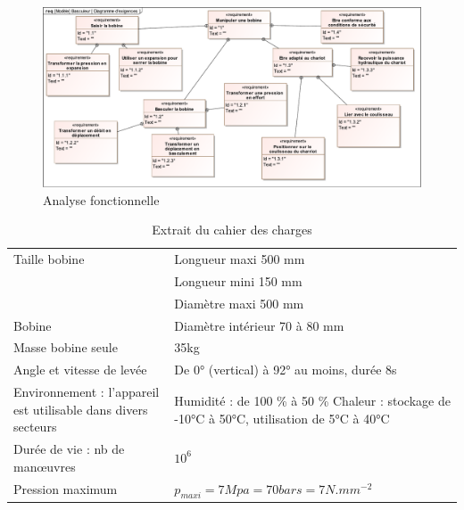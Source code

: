 \begin{figure}[ht!]
\begin{center}
 \includegraphics[width=0.8\linewidth]{img/fig04c}
\end{center}
\caption{Analyse fonctionnelle}
\label{fig04c}
\end{figure}

\begin{table}[ht!]
\begin{center}
\begin{tabular}{|m{6cm}|m{10cm}|}
\hline
Taille bobine & Longueur maxi 500 mm \\
& Longueur mini 150 mm \\
& Diamètre maxi 500 mm \\
\hline
Bobine & Diamètre intérieur 70 à 80 mm \\
\hline
Masse bobine seule & 35kg \\
\hline
Angle et vitesse de levée & De 0° (vertical) à 92° au moins, durée 8s \\
\hline
Environnement : l'appareil est utilisable dans divers secteurs & Humidité : de 100 \% à 50 \% \newline
Chaleur : stockage de -10°C à 50°C, utilisation de 5°C à 40°C \\
\hline
Durée de vie : nb de man\oe uvres & $10^6$ \\
\hline
Pression maximum & $p_{maxi}=7Mpa=70bars=7N.mm^{-2}$ \\
\hline
\end{tabular}
\end{center}
\caption{Extrait du cahier des charges}
\label{fig05}
\end{table}

